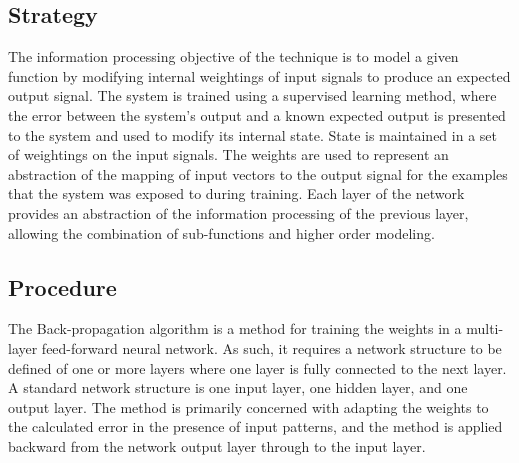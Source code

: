 \subsection{Strategy}
The information processing objective of the technique is to model a given function by modifying internal weightings of input signals to produce an expected output signal.
The system is trained using a supervised learning method, where the error between the system's output and a known expected output is presented to the system and used to modify its internal state. State is maintained in a set of weightings on the input signals. The weights are used to represent an abstraction of the mapping of input vectors to the output signal for the examples that the system was exposed to during training.
Each layer of the network provides an abstraction of the information processing of the previous layer, allowing the combination of sub-functions and higher order modeling.

\subsection{Procedure}
The Back-propagation algorithm is a method for training the weights in a multi-layer feed-forward neural network. As such, it requires a network structure to be defined of one or more layers where one layer is fully connected to the next layer. A standard network structure is one input layer, one hidden layer, and one output layer. The method is primarily concerned with adapting the weights to the calculated error in the presence of input patterns, and the method is applied backward from the network output layer through to the input layer.

